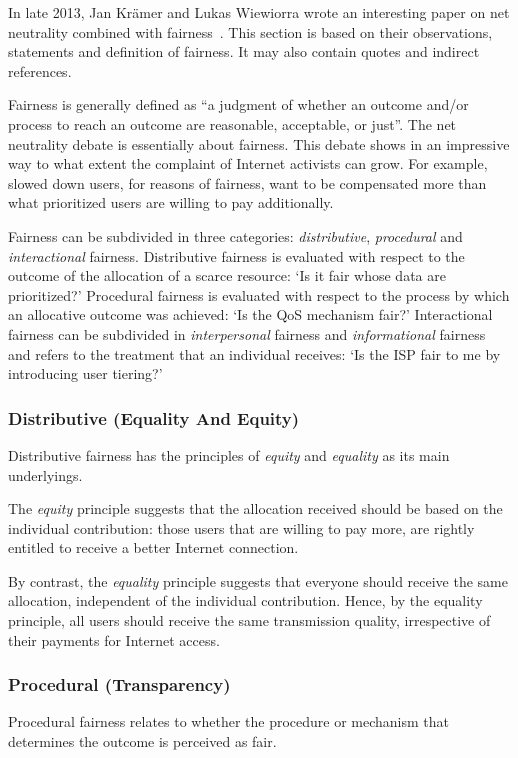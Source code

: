 
In late 2013, Jan Kr\"{a}mer and Lukas Wiewiorra wrote an interesting paper on net neutrality combined with fairness~\cite{kramer2013fair}. This section is based on their observations, statements and definition of fairness. It may also contain quotes and indirect references.

Fairness is generally defined as ``a judgment of whether an outcome and/or process to reach an outcome are reasonable, acceptable, or just''. The net neutrality debate is essentially about fairness. This debate shows in an impressive way to what extent the complaint of Internet activists can grow. For example, slowed down users, for reasons of fairness, want to be compensated more than what prioritized users are willing to pay additionally.

Fairness can be subdivided in three categories: \emph{distributive}, \emph{procedural} and \emph{interactional} fairness. Distributive fairness is evaluated with respect to the outcome of the allocation of a scarce resource: `Is it fair whose data are prioritized?' Procedural fairness is evaluated with respect to the process by which an allocative outcome was achieved: `Is the \ac{QoS} mechanism fair?' Interactional fairness can be subdivided in \emph{interpersonal} fairness and \emph{informational} fairness and refers to the treatment that an individual receives: `Is the \ac{ISP} fair to me by introducing user tiering?'

\subsubsection{Distributive (Equality And Equity)}
Distributive fairness has the principles of \emph{equity} and \emph{equality} as its main underlyings.

The \emph{equity} principle suggests that the allocation received should be based on the individual contribution: those users that are willing to pay more, are rightly entitled to receive a better Internet connection.

By contrast, the \emph{equality} principle suggests that everyone should receive the same allocation, independent of the individual contribution. Hence, by the equality principle, all users should receive the same transmission quality, irrespective of their payments for Internet access.

\subsubsection{Procedural (Transparency)}
Procedural fairness relates to whether the procedure or mechanism that determines the outcome is perceived as fair.

